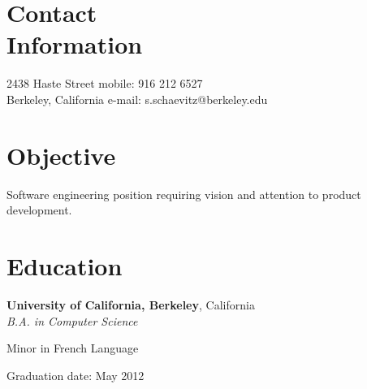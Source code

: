 \documentclass[margin,line]{resume}
\begin{document}
\begin{resume}

    \section{\mysidestyle Contact\\Information}

    2438 Haste Street                       \hfill mobile: 916 212 6527         \vspace{0mm}\\\vspace{0mm}%
   Berkeley, California              	\hfill e-mail: s.schaevitz@berkeley.edu          \vspace{0mm}\\\vspace{-4.5mm}%

    \section{\mysidestyle Objective}
	Software engineering position requiring vision and attention to product development.

    \section{\mysidestyle Education}

    \textbf{University of California, Berkeley}, California \vspace{1mm}\\\vspace{0mm}%
    \textsl{B.A. in Computer Science} \hfill \textbf{}\vspace{-3mm}\\\vspace{-1mm}%
    \begin{list2}
		\item Minor in French Language
        \item Graduation date: May 2012
    \end{list2}\vspace{-1.5mm}



\end{resume}
\end{document}
